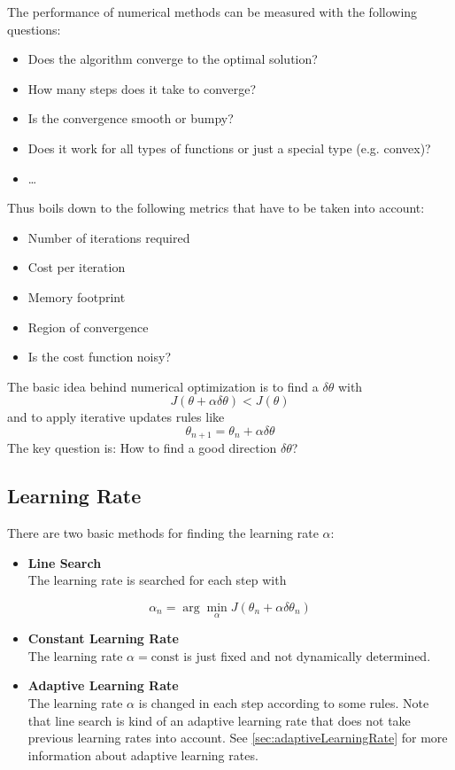 \documentclass[a4paper, 11pt, accentcolor = tud3b]{tudreport}
\newcommand{\const}{\ensuremath{\textrm{const}}}
\begin{document}
			The performance of numerical methods can be measured with the following questions:
			\begin{itemize}
				\item Does the algorithm converge to the optimal solution?
				\item How many steps does it take to converge?
				\item Is the convergence smooth or bumpy?
				\item Does it work for all types of functions or just a special type (e.g. convex)?
				\item \dots
			\end{itemize}
			Thus boils down to the following metrics that have to be taken into account:
			\begin{itemize}
				\item Number of iterations required
				\item Cost per iteration
				\item Memory footprint
				\item Region of convergence
				\item Is the cost function noisy?
			\end{itemize}

			The basic idea behind numerical optimization is to find a \( \delta\theta \) with
			\begin{equation}
				J(\theta + \alpha\delta\theta) < J(\theta)
			\end{equation}
			and to apply iterative updates rules like
			\begin{equation}
				\theta_{n+1} = \theta_n + \alpha\delta\theta
			\end{equation}
			The key question is: How to find a good direction \(\delta\theta\)?

			\subsection{Learning Rate}
				There are two basic methods for finding the learning rate \(\alpha\):
				\begin{itemize}
					\item \textbf{Line Search} \\ The learning rate is searched for each step with
				\end{itemize}
				\begin{equation}
					\alpha_n = \arg\min_\alpha J(\theta_n + \alpha\delta\theta_n)
				\end{equation}
				\begin{itemize}
					\item \textbf{Constant Learning Rate} \\ The learning rate \( \alpha = \const \) is just fixed and not dynamically determined.
					\item \textbf{Adaptive Learning Rate} \\ The learning rate \( \alpha \) is changed in each step according to some rules. Note that line search is kind of an adaptive learning rate that does not take previous learning rates into account. See \ref{sec:adaptiveLearningRate} for more information about adaptive learning rates.
				\end{itemize}
\end{document}
